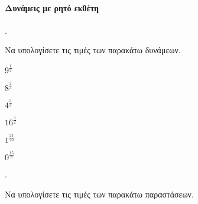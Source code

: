 \documentclass[11pt,a4paper,twocolumn]{article}
\newcounter{askhsh}
\newcommand{\askhsh}{\large\theaskhsh.\ \addtocounter{askhsh}{1}}
\begin{document}
\paragraph{Δυνάμεις με ρητό εκθέτη}
\askhsh Να υπολογίσετε τις τιμές των παρακάτω δυνάμεων.
\begin{multicols}{3}
\begin{alist}
\item $9^{\frac{1}{2}}$
\item $8^{\frac{2}{3}}$
\item $4^{\frac{3}{2}}$
\item $16^{\frac{3}{2}}$
\item $1^{\frac{21}{20}}$
\item $0^{\frac{15}{8}}$
\end{alist}
\end{multicols}
\askhsh Να υπολογίσετε τις τιμές των παρακάτω παραστάσεων.
\end{document}
